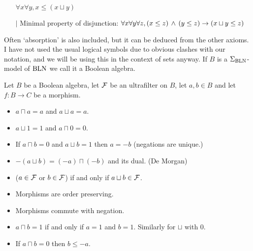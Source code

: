 \begin{dfn}
\begin{itemize}
            $\forall x \forall y, x \leq (x \sqcup y)$ 
        \item[$\vert$] Minimal property of disjunction:
            $\forall x \forall y \forall z, 
            (x \leq z) \, \land \, (y \leq z) \to (x \sqcup y \leq z)$ 
        \end{itemize}
    Often `absorption' is also included, 
    but it can be deduced from the other axioms.
    I have not used the usual logical symbols due to obvious clashes with 
    our notation, 
    and we will be using this in the context of sets anyway.
    If $B$ is a $\Sigma_{\mathrm{BLN}}$-model of $\mathrm{BLN}$ we call it a Boolean algebra.
\end{dfn}

\begin{lem}
    Let $B$ be a Boolean algebra, let $\mathcal{F}$ be an ultrafilter
    on $B$, let $a,b \in B$ and let $f : B \to C$ be a morphism.
    \begin{itemize}
        \item $a \sqcap a = a$ and $a \sqcup a = a$.
        \item $a \sqcup 1 = 1$ and $a \sqcap 0 = 0$.
        \item If $a \sqcap b = 0$ and $a \sqcup b = 1$ then $a = - b$
            (negations are unique.)
        \item $- (a \sqcup b) = (- a) \sqcap (- b)$ and its dual. 
            (De Morgan)
        \item ($a \in \mathcal{F}$ or $b \in \mathcal{F}$) if and only if $a \sqcup b \in \mathcal{F}$.
        \item Morphisms are order preserving.
        \item Morphisms commute with negation.
        \item $a \sqcap b = 1$ if and only if $a = 1$ and $b = 1$.
            Similarly for $\sqcup$ with $0$.
        \item If $a \sqcap b = 0$ then $b \leq - a$.
    \end{itemize}
\end{lem}
